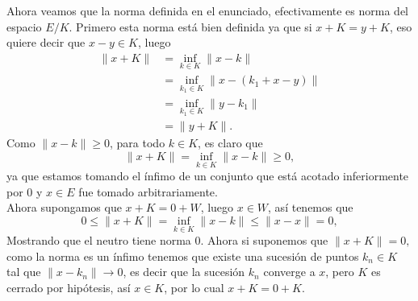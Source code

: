\begin{itemize}
\begin{itemize}
\begin{sproof}
            Ahora veamos que la norma definida en el enunciado, efectivamente es norma del espacio $E/K.$ Primero esta norma está bien definida ya que si $x+K=y+K$, eso quiere decir que $x-y\in K$, luego
            \begin{align*}
                 \|x+K\|&=\inf_{k\in K}\|x-k\|\\
                 &=\inf_{k_1\in K}\|x-(k_1+x-y)\|\\
                 &=\inf_{k_1\in K}\|y-k_1\|\\
                 &=\|y+K\|.
             \end{align*}
             Como $\|x-k\|\geq 0$, para todo $k\in K$, es claro que 
            $$\|x+K\|=\inf_{k\in K}\|x-k\|\geq 0,$$
            ya que estamos tomando el ínfimo de un conjunto que está acotado inferiormente por $0$ y $x\in E$ fue tomado arbitrariamente.\\

            Ahora supongamos que $x+K=0+W$, luego $x\in W$, así tenemos que 
            $$0\leq \|x+K\|=\inf_{k\in K}\|x-k\|\leq \|x-x\|=0,$$
            Mostrando que el neutro tiene norma $0.$ Ahora si suponemos que $\|x+K\|=0,$ como la norma es un ínfimo tenemos que existe una sucesión de puntos $k_n\in K$ tal que $\|x-k_n\|\to 0$, es decir que la sucesión $k_n$ converge a $x$, pero $K$ es cerrado por hipótesis, así $x\in K$, por lo cual $x+K=0+K$. 


\end{sproof}
\end{itemize}
\end{itemize}
